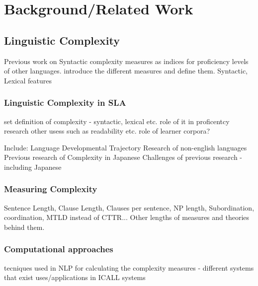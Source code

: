 \chapter{Background/Related Work}
\section{Linguistic Complexity}
Previous work on Syntactic complexity measures as indices for proficiency levels of other languages.
introduce the different measures and define them.
Syntactic, Lexical features

\subsection{Linguistic Complexity in SLA}
set definition of complexity - syntactic, lexical etc.
role of it in proficentcy research
other usess such as readability etc.
role of learner corpora?

Include:
Language Developmental Trajectory
Research of non-english languages
Previous research of Complexity in Japanese
Challenges of previous research - including Japanese


\subsection{Measuring Complexity}
Sentence Length, Clause Length, Clauses per sentence, NP length, Subordination, coordination, MTLD instead of CTTR...
Other lengths of measures and theories behind them.

\subsection{Computational approaches}
tecniques used in NLP for calculating the complexity measures - different systems that exist
uses/applications in ICALL systems







